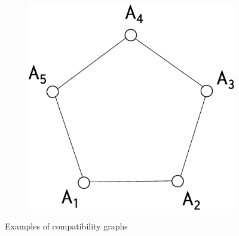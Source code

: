 \documentclass[a4paper]{article}
\theoremstyle{definition}
\begin{document}
\begin{figure}[h]
\begin{subfigure}{.3\textwidth}
    \end{subfigure}
    \begin{subfigure}{.3\textwidth}
        \center
        \includegraphics[width=\textwidth]{KCBS_obs.pdf}
        \caption{}
        \label{fig:jointprob_KCBS}
    \end{subfigure}
    \caption{Examples of compatibility graphs}
    \label{fig:jointprob_graphs}
\end{figure}
\end{document}
